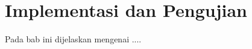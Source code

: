 \chapter{Implementasi dan Pengujian}
\label{chap:implementasiDanPengujian}

Pada bab ini dijelaskan mengenai ....